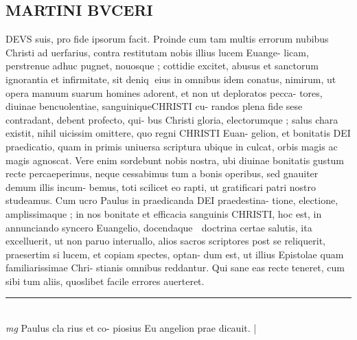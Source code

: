 \documentclass{article}
\begin{document}
\begin{pages}
\section*{MARTINI BVCERI }\pstart DEVS suis, pro fide ipsorum facit.   \pend\pstart Proinde cum tam multis errorum nubibus Christi ad uerfarius, contra restitutam nobis illius lucem Euange- licam, perstrenue adhuc pugnet, nouosque ; cottidie excitet, abusus et sanctorum ignorantia et infirmitate, sit deniq eius in omnibus idem conatus, nimirum, ut opera manuum suarum homines adorent, et non ut deploratos pecca- tores, diuinae bencuolentiae, sanguiniqueCHRISTI cu- randos plena fide sese contradant, debent profecto, qui- bus Christi gloria, electorumque ; salus chara existit, nihil uicissim omittere, quo regni CHRISTI Euan- gelion, et bonitatis DEI praedicatio, quam in primis uniuersa scriptura ubique in culcat, orbis magis ac magis agnoscat.  Vere enim sordebunt nobis nostra, ubi diuinae bonitatis gustum recte percaeperimus, neque  cessabimus tum a bonis operibus, sed gnauiter demum illis incum- bemus, toti scilicet eo rapti, ut gratificari patri nostro studeamus.   \pend\pstart Cum ucro Paulus in praedicanda DEI praedestina- tione, electione, amplissimaque ; in nos bonitate et efficacia sanguinis CHRISTI, hoc est, in annunciando syncero Euangelio, docendaque  doctrina certae salutis, ita excelluerit, ut non paruo interuallo, alios sacros scriptores post se reliquerit, praesertim si lucem, et copiam spectes, optan- dum est, ut illius Epistolae quam familiarissimae Chri- stianis omnibus reddantur.  Qui sane eas recte teneret, cum sibi tum aliis, quoslibet facile errores auerteret.   \pend
\vspace{0.5cm}\noindent
\vspace{0.2cm}\rule{1cm}{0.2pt}\\ 
\hspace{0.2cm}\textit{mg}
\footnotesize Paulus cla rius et co- piosius Eu angelion prae dicauit.  
\normalsize| 

\end{pages}
\end{document}
